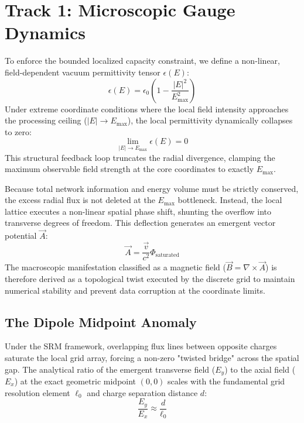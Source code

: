\documentclass[twocolumn,prd,amsmath,amssymb,superscriptaddress]{revtex4-2}
\begin{document}
\section{Track 1: Microscopic Gauge Dynamics}

To enforce the bounded localized capacity constraint, we define a non-linear, field-dependent vacuum permittivity tensor $\epsilon(E)$:
\begin{equation}
    \epsilon(E) = \epsilon_0 \left( 1 - \frac{|E|^2}{E_{\text{max}}^2} \right)
\end{equation}
Under extreme coordinate conditions where the local field intensity approaches the processing ceiling ($|E| \to E_{\text{max}}$), the local permittivity dynamically collapses to zero:
\begin{equation}
    \lim_{|E| \to E_{\text{max}}} \epsilon(E) = 0
\end{equation}
This structural feedback loop truncates the radial divergence, clamping the maximum observable field strength at the core coordinates to exactly $E_{\text{max}}$.

Because total network information and energy volume must be strictly conserved, the excess radial flux is not deleted at the $E_{\text{max}}$ bottleneck. Instead, the local lattice executes a non-linear spatial phase shift, shunting the overflow into transverse degrees of freedom. This deflection generates an emergent vector potential $\vec{A}$:
\begin{equation}
    \vec{A} = \frac{\vec{v}}{c^2} \Phi_{\text{saturated}}
\end{equation}
The macroscopic manifestation classified as a magnetic field ($\vec{B} = \nabla \times \vec{A}$) is therefore derived as a topological twist executed by the discrete grid to maintain numerical stability and prevent data corruption at the coordinate limits.

\subsection{The Dipole Midpoint Anomaly}
Under the SRM framework, overlapping flux lines between opposite charges saturate the local grid array, forcing a non-zero "twisted bridge" across the spatial gap. The analytical ratio of the emergent transverse field ($E_y$) to the axial field ($E_x$) at the exact geometric midpoint $(0,0)$ scales with the fundamental grid resolution element $\ell_0$ and charge separation distance $d$:
\begin{equation}
    \frac{E_y}{E_x} \approx \frac{d}{\ell_0}
\end{equation}
\end{document}

